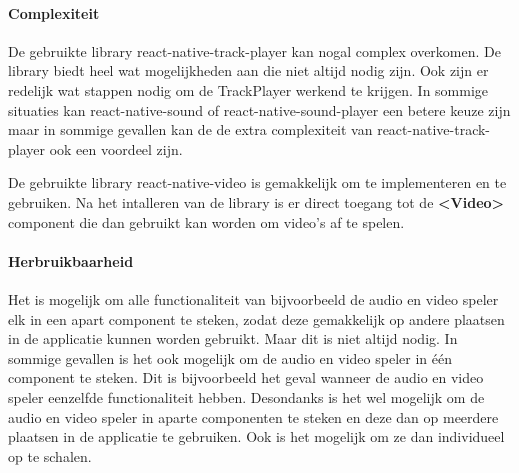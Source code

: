 \paragraph{Complexiteit}
De gebruikte library react-native-track-player kan nogal complex overkomen. De library 
biedt heel wat mogelijkheden aan die niet altijd nodig zijn. Ook zijn er redelijk wat stappen 
nodig om de TrackPlayer werkend te krijgen. In sommige situaties kan 
react-native-sound of react-native-sound-player een betere keuze zijn maar in sommige gevallen kan de 
de extra complexiteit van react-native-track-player ook een voordeel zijn. 

De gebruikte library react-native-video is gemakkelijk om te implementeren en te gebruiken.
Na het intalleren van de library is er direct toegang tot de \textbf{<Video>} component
die dan gebruikt kan worden om video's af te spelen.

\paragraph{Herbruikbaarheid}
Het is mogelijk om alle functionaliteit van bijvoorbeeld de audio en video speler elk in een 
apart component te steken, zodat deze gemakkelijk op andere plaatsen in de applicatie kunnen worden 
gebruikt. Maar dit is niet altijd
nodig. In sommige gevallen is het ook mogelijk om de audio en video speler in één component
te steken. Dit is bijvoorbeeld het geval wanneer de audio en video speler eenzelfde functionaliteit
hebben. Desondanks is het wel mogelijk om de audio en video speler in aparte componenten te steken
en deze dan op meerdere plaatsen in de applicatie te gebruiken. Ook is het mogelijk om ze dan 
individueel op te schalen.
